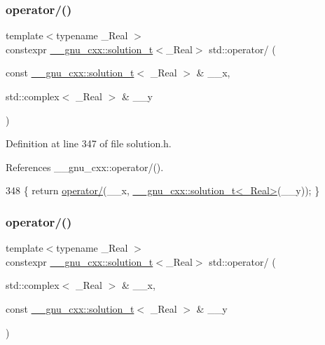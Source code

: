 \subsubsection{\texorpdfstring{operator/()}{operator/()}\hspace{0.1cm}{\footnotesize\ttfamily [4/5]}}
{\footnotesize\ttfamily template$<$typename \+\_\+\+Real $>$ \\
constexpr \hyperlink{namespace____gnu__cxx_ae20ea642de50eb361074c62676b0159c}{\+\_\+\+\_\+gnu\+\_\+cxx\+::solution\+\_\+t}$<$\+\_\+\+Real$>$ std\+::operator/ (\begin{DoxyParamCaption}\item[{const \hyperlink{namespace____gnu__cxx_ae20ea642de50eb361074c62676b0159c}{\+\_\+\+\_\+gnu\+\_\+cxx\+::solution\+\_\+t}$<$ \+\_\+\+Real $>$ \&}]{\+\_\+\+\_\+x,  }\item[{std\+::complex$<$ \+\_\+\+Real $>$ \&}]{\+\_\+\+\_\+y }\end{DoxyParamCaption})}



Definition at line 347 of file solution.\+h.



References \+\_\+\+\_\+gnu\+\_\+cxx\+::operator/().


\begin{DoxyCode}
348     \{ \textcolor{keywordflow}{return} \hyperlink{namespacestd_a51cf4f07903a8d424249d8198c73843d}{operator/}(\_\_x, \hyperlink{namespace____gnu__cxx_ae20ea642de50eb361074c62676b0159c}{\_\_gnu\_cxx::solution\_t<\_Real>}(\_\_y)); \}
\end{DoxyCode}
\mbox{\label{namespacestd_a51cf4f07903a8d424249d8198c73843d}} 
\subsubsection{\texorpdfstring{operator/()}{operator/()}\hspace{0.1cm}{\footnotesize\ttfamily [5/5]}}
{\footnotesize\ttfamily template$<$typename \+\_\+\+Real $>$ \\
constexpr \hyperlink{namespace____gnu__cxx_ae20ea642de50eb361074c62676b0159c}{\+\_\+\+\_\+gnu\+\_\+cxx\+::solution\+\_\+t}$<$\+\_\+\+Real$>$ std\+::operator/ (\begin{DoxyParamCaption}\item[{std\+::complex$<$ \+\_\+\+Real $>$ \&}]{\+\_\+\+\_\+x,  }\item[{const \hyperlink{namespace____gnu__cxx_ae20ea642de50eb361074c62676b0159c}{\+\_\+\+\_\+gnu\+\_\+cxx\+::solution\+\_\+t}$<$ \+\_\+\+Real $>$ \&}]{\+\_\+\+\_\+y }\end{DoxyParamCaption})}



